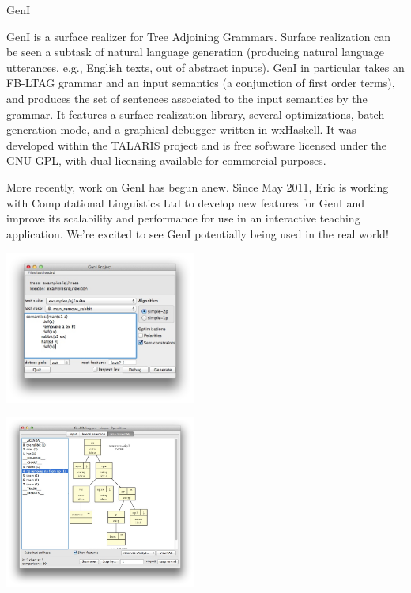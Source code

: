 \begin{hcarentry}[updated]{GenI}
\label{geni}
\makeheader

GenI is a surface realizer for Tree Adjoining Grammars.  Surface
realization can be seen a subtask of natural language generation
(producing natural language utterances, e.g., English texts, out of
abstract inputs).  GenI in particular takes an FB-LTAG grammar and an
input semantics (a conjunction of first order terms), and produces the
set of sentences associated to the input semantics by the grammar.  It
features a surface realization library, several optimizations, batch
generation mode, and a graphical debugger written in wxHaskell.  It was
developed within the TALARIS project and is free software licensed under
the GNU GPL, with dual-licensing available for commercial purposes.

More recently, work on GenI has begun anew.  Since May 2011, Eric is
working with Computational Linguistics Ltd to develop new features for
GenI and improve its scalability and performance for use in an
interactive teaching application. We're excited to see GenI potentially
being used in the real world!

\begin{center}
\includegraphics[width=0.47\textwidth]{html/GenI-main-screenshot.jpg}
\end{center}

\begin{center}
\includegraphics[width=0.47\textwidth]{html/GenI-debugger-screenshot.jpg}
\end{center}


\end{hcarentry}
